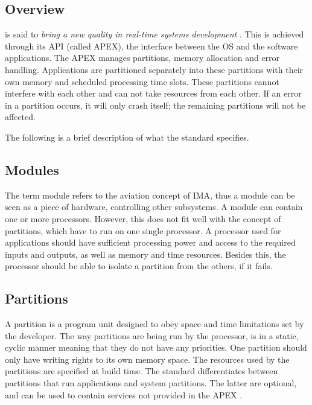 \subsection{Overview}

\arinc{} is said to \textit{bring a new quality in real-time systems
development} \cite{arinc_scarlett}.
This is achieved through its API (called APEX), the interface between 
the OS and the software applications.
The APEX manages partitions, memory allocation and error handling.
Applications are partitioned separately into these partitions 
with their own memory and scheduled processing time slots.
These partitions cannot interfere with each other and can 
not take resources from each other.
If an error in a partition occurs, it will only crash itself;
the remaining partitions will not be affected.

The following is a brief description of what the standard specifies.

\subsection{Modules}
The term module refers to the aviation concept of IMA, thus a module
can be seen as a piece of hardware, controlling other subsystems.
A module can contain one or more processors. However, this does not fit 
well with the concept of partitions,
which have to run on one single processor. \cite{arinc_page_11}
A processor used for \arinc{} applications should have sufficient processing
power and access to the required inputs and outputs,
as well as memory and time resources.
Besides this, the processor should be able to isolate a partition from
the others, if it fails.
\cite{arinc_page_12}

\subsection{Partitions}
A partition is a program unit designed to obey space and time limitations
set by the developer. The way partitions are being run by the processor,
is in a static, cyclic manner meaning that they do not have any priorities.
One partition should only have writing rights to its own memory space. 
\cite{arinc_page_13}
The resources used by the partitions are specified at build time.
\cite{arinc_page_14}
The standard differentiates between partitions that run applications and system partitions. The latter are optional, and can be used to contain
services not provided in the APEX \cite{scarlett}.


